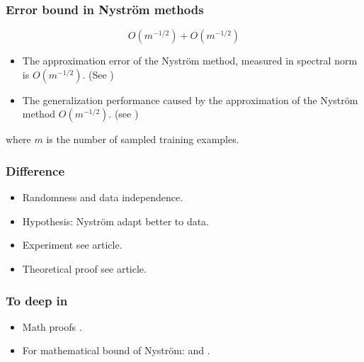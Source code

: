 \begin{frame}
  \frametitle{Error bound in Nyström methods}

\begin{equation}
    O( m^{-1/2}) +  O( m^{-1/2}) 
\end{equation}  
\begin{itemize}
  \item The approximation error of the Nyström method, measured in
  spectral norm is $O( m^{-1/2})$. (See \cite{JMLR:v6:drineas05a}) 
  \item The generalization performance
  caused by the approximation of the Nyström method $O( m^{-1/2})$. (see \cite{pmlr-v9-cortes10a}) 
\end{itemize}
where 
$m$ is the number of sampled training examples.

\end{frame}

\begin{frame}
  \frametitle{Difference}

  \begin{itemize}
    \item Randomness  and data independence. 
    \item Hypothesis: Nyström adapt better to data. 
    \item Experiment see article. 
    \item Theoretical proof see article. 
  \end{itemize}
\end{frame}

\begin{frame}
  \frametitle{To deep in}

  \begin{itemize}
    \item Math proofs \cite{NystromVSRandomFourierFeatures}.
    \item For mathematical bound of Nyström: \cite{JMLR:v6:drineas05a} and \cite{pmlr-v9-cortes10a}. 
  \end{itemize}


\end{frame}
